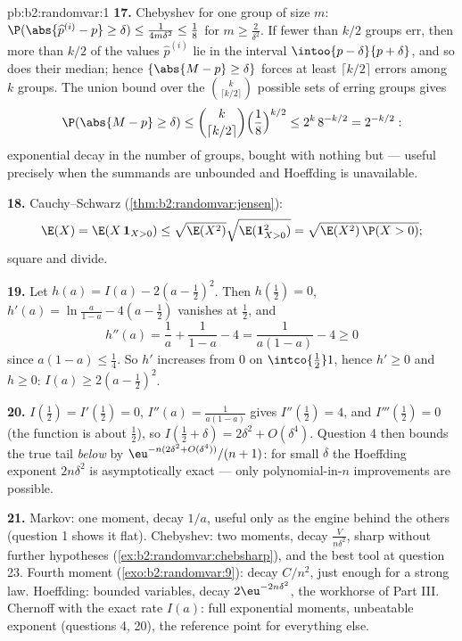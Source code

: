\begin{solution}{pb:b2:randomvar:1}
\textbf{17.} Chebyshev for one group of size $m$: $\P(\abs{
\widehat p^{(i)} - p} \geq \delta) \leq \frac{1}{4m\delta^2}
\leq \frac18$ for $m \geq \frac2{\delta^2}$. If fewer than
$k/2$ groups err, then more than $k/2$ of the values
$\widehat p^{(i)}$ lie in the  interval $\intoo{p -
\delta}{p + \delta}$, and so does their median; hence
$\{\abs{M - p} \geq \delta\}$ forces at least $\lceil
k/2\rceil$ errors among $k$  groups. The union
bound over the $\binom k{\lceil k/2\rceil}$ possible sets of
erring groups gives
\[
\P(\abs{M - p} \geq \delta)
\leq \binom{k}{\lceil k/2\rceil}
\Bigl(\frac18\Bigr)^{k/2}
\leq 2^k\,8^{-k/2} = 2^{-k/2} :
\]
exponential decay in the number of groups, bought with
nothing but  --- useful precisely when the summands
are unbounded and Hoeffding is unavailable.

\textbf{18.} Cauchy--Schwarz
(\cref{thm:b2:randomvar:jensen}):
\[
\E(X) = \E(X\,\mathbf 1_{X>0})
\leq \sqrt{\E(X^2)}\sqrt{\E(\mathbf 1_{X>0}^2)}
= \sqrt{\E(X^2)\,\P(X > 0)} ;
\]
square and divide.

\textbf{19.} Let $h(a) = I(a) - 2(a - \tfrac12)^2$. Then
$h(\tfrac12) = 0$, $h'(a) = \ln\frac a{1-a} - 4(a -
\tfrac12)$ vanishes at $\tfrac12$, and
\[
h''(a) = \frac1a + \frac1{1-a} - 4 = \frac{1}{a(1-a)} - 4
\geq 0
\]
since $a(1-a) \leq \frac14$. So $h'$ increases from $0$ on
$\intco{\frac12}1$, hence $h' \geq 0$ and $h \geq 0$: $I(a)
\geq 2(a - \tfrac12)^2$.

\textbf{20.} $I(\tfrac12) = I'(\tfrac12) = 0$, $I''(a) =
\frac1{a(1-a)}$ gives $I''(\tfrac12) = 4$, and $I'''(\tfrac12)
= 0$ (the function is  about $\tfrac12$), so
$I(\tfrac12 + \delta) = 2\delta^2 + O(\delta^4)$. Question 4
then bounds the true tail \emph{below} by
$\eu^{-n(2\delta^2 + O(\delta^4))}/(n+1)$: for small $\delta$
the Hoeffding exponent $2n\delta^2$ is asymptotically exact
--- only polynomial-in-$n$ improvements are possible.

\textbf{21.} Markov: one moment, decay $1/a$, useful only as
the engine behind the others (question 1 shows it flat).
Chebyshev: two moments, decay $\frac{V}{n\delta^2}$, sharp
without further hypotheses
(\cref{ex:b2:randomvar:chebsharp}), and the best tool at
question 23. Fourth moment (\cref{exo:b2:randomvar:9}):
decay $C/n^2$, just enough  for a strong law.
Hoeffding: bounded variables, decay $2\eu^{-2n\delta^2}$,
the workhorse of Part III. Chernoff with the exact rate
$I(a)$: full exponential moments, unbeatable exponent
(questions 4, 20), the reference point for everything else.


\end{solution}
